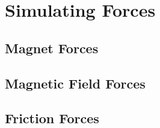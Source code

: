 \section{Simulating Forces}

\cite{Lu2023}


\subsection{Magnet Forces}
\label{sec:force_magnet}


\subsection{Magnetic Field Forces}
\label{sec:force_field}



\subsection{Friction Forces}
\label{sec:force_friction}



